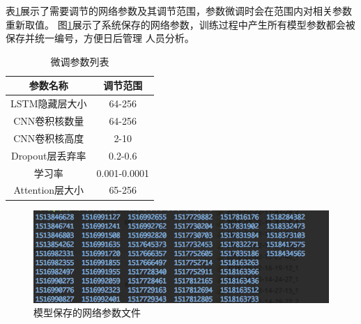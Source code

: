 表\ref{net_data_alert_table}展示了需要调节的网络参数及其调节范围，参数微调时会在范围内对相关参数重新取值。
图\ref{train_tmp_data}展示了系统保存的网络参数，训练过程中产生所有模型参数都会被保存并统一编号，方便日后管理
人员分析。
\begin{table}[h]
    \caption{微调参数列表}
    \begin{tabular}{|c|c|}
        \hline
        参数名称 & 调节范围 \\
        \hline
         LSTM隐藏层大小 & 64-256 \\
        \hline
        CNN卷积核数量 & 64-256 \\
        \hline
        CNN卷积核高度 & 2-10 \\
        \hline
        Dropout层丢弃率 & 0.2-0.6 \\
        \hline
        学习率 & 0.001-0.0001 \\
        \hline
        Attention层大小 & 65-256 \\
        \hline
    \end{tabular}
    \label{net_data_alert_table}
    \end{table}

\begin{figure}[!hbp]
    \includegraphics[scale=0.6]{picture/train_tmp_data.png}
    \caption{模型保存的网络参数文件}
    \label{train_tmp_data}
\end{figure}
